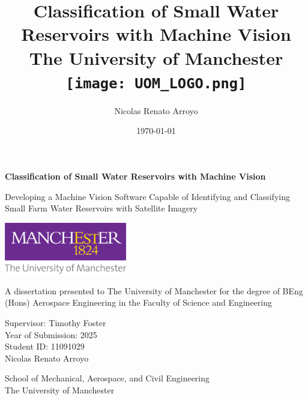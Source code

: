 \begin{titlepage}
    \begin{center}
        \vspace*{1cm}
            
        \Huge
        \textbf{Classification of Small Water Reservoirs with Machine Vision}
        
        \vspace{1.5cm}
        \Large
        Developing a Machine Vision Software Capable of Identifying and Classifying Small Farm Water Reservoirs with Satellite Imagery
                
        \vspace{1cm}
        
        \includegraphics[width=0.4\textwidth]{contents/figures/UOM_LOGO.jpg}
        
        \vspace{1cm}
        
        \Large
        A dissertation presented to The University of Manchester for the degree of BEng (Hons) Aerospace Engineering in the Faculty of Science and Engineering

        \vfill
        \large
        Supervisor: Timothy Foster\\
        Year of Submission: 2025\\
        Student ID: 11091029\\
        Nicolas Renato Arroyo

        \vspace{1cm}
            
        \Large
        School of Mechanical, Aerospace, and Civil Engineering\\
        The University of Manchester\\
            
    \end{center}
\end{titlepage}

\title{
{Classification of Small Water Reservoirs with Machine Vision}\\
{\large The University of Manchester}\\
{\texttt{[image: UOM\_LOGO.png]}}
}
\author{Nicolas Renato Arroyo}
\date{\today}